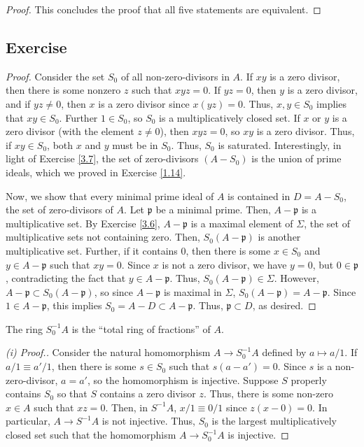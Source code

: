 \begin{proof}
This concludes the proof that all five statements are equivalent.
\end{proof}

\subsection{Exercise}\label{3.9}

\begin{proof}
Consider the set $S_0$ of all non-zero-divisors in $A$. If $xy$ is a zero divisor, then there is some nonzero $z$ such that $xyz = 0$. If $yz = 0$, then $y$ is a zero
divisor, and if $yz \neq 0$, then $x$ is a zero divisor since $x(yz) = 0$. Thus, $x,y \in S_0$ implies that $xy \in S_0$. Further $1 \in S_0$, so $S_0$ is a multiplicatively closed set.
If $x$ or $y$ is a zero divisor (with the element $z \neq 0$), then $xyz = 0$, so $xy$ is a zero divisor. Thus, if $xy \in S_0$, both $x$ and $y$ must be in $S_0$. Thus, $S_0$ is saturated. 
Interestingly, in light of Exercise \ref{3.7}, the set of zero-divisors $(A - S_0)$ is the union of prime ideals, which we proved in Exercise \ref{1.14}.

Now, we show that every minimal prime ideal of $A$ is contained in $D = A - S_0$, the set of zero-divisors of $A$. Let $\mathfrak{p}$ be a minimal prime. Then, $A - \mathfrak{p}$ is a multiplicative set. By 
Exercise \ref{3.6}, $A - \mathfrak{p}$ is a maximal element of $\Sigma$, the set of multiplicative sets not containing zero. Then, $S_0(A - \mathfrak{p})$ is another multiplicative set. Further, if it contains
$0$, then there is some $x \in S_0$ and $y \in A - \mathfrak{p}$ such that $xy = 0$. Since $x$ is not a zero divisor, we have $y = 0$, but $0 \in \mathfrak{p}$, contradicting the fact that $y \in A - \mathfrak{p}$.
Thus, $S_0(A - \mathfrak{p}) \in \Sigma$. However, $A - \mathfrak{p} \subset S_0(A - \mathfrak{p})$, so since $A - \mathfrak{p}$ is maximal in $\Sigma$, $S_0(A - \mathfrak{p}) = A - \mathfrak{p}$. Since $1 \in A - \mathfrak{p}$,
this implies $S_0 = A - D \subset A - \mathfrak{p}$. Thus, $\mathfrak{p} \subset D$, as desired.
\end{proof}

\begin{remark}
The ring $S_0^{-1}A$ is the ``total ring of fractions'' of $A$.
\end{remark}

\begin{proof}[(i) Proof.]
Consider the natural homomorphism $A \to S_0^{-1}A$ defined by $a \mapsto a/1$. If $a/1 \equiv a'/1$, then there is some $s \in S_0$ such that $s(a - a') = 0$. Since $s$ is a non-zero-divisor, $a = a'$,
so the homomorphism is injective. Suppose $S$ properly contains $S_0$ so that $S$ contains a zero divisor $z$. Thus, there is some non-zero $x \in A$ such that $xz = 0$. Then, in $S^{-1}A$, $x/1 \equiv 0/1$ since
$z(x - 0) = 0$. In particular, $A \to S^{-1}A$ is not injective. Thus, $S_0$ is the largest multiplicatively closed set such that the homomorphism $A \to S_0^{-1}A$ is injective.
\end{proof}


